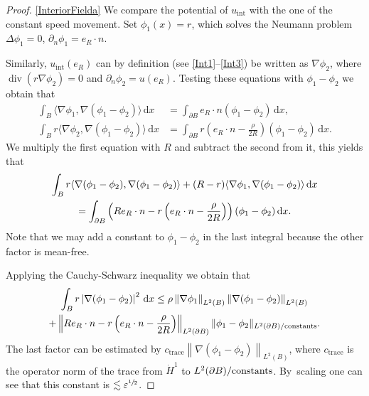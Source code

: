 \documentclass[10pt]{amsart}
\let\epsilon\varepsilon
\newcommand{\constants}{\textup{constants}}
\theoremstyle{definition}
\renewcommand{\div}{\operatorname{div}}
\newcommand\norm[1]{\left\lVert #1\right\rVert}
\newcommand\anorm[1]{\lVert #1\rVert}
\newcommand\scalar[2]{\langle #1,#2\rangle}
\newcommand\eq{=}
\newcommand\dd{\,\mathrm{d}}
\newcommand\dx{\dd x}
\let\de\partial
\let\eps\epsilon
\begin{document}
\skpt
\begin{proof}

\eqref{InteriorFielda}
We compare the potential of $u_\mathrm{int}$ with the one of the constant speed movement.
Set $\phi_1(x)=r$, which solves the Neumann problem $\Delta \phi_1=0$, $\de_n\phi_1=e_R\cdot n$.

Similarly, $u_\mathrm{int}(e_R)$ can by definition (see \eqref{Int1}--\eqref{Int3}) be written as $\nabla \phi_2$, where $\div(r\nabla\phi_2)=0$ and $\de_n\phi_2=u(e_R)$. Testing these equations with $\phi_1-\phi_2$ we obtain that
\begin{align*}
\int_{B} \scalar{\nabla \phi_1}{\nabla(\phi_1-\phi_2)}\dx&\eq\int_{\de B} e_R\cdot n(\phi_1-\phi_2)\dx,\\
\int_{B}r\scalar{\nabla \phi_2}{\nabla(\phi_1-\phi_2)}\dx&\eq\int_{\de B}r\left(e_R\cdot n-\frac{\rho}{2R}\right)(\phi_1-\phi_2)\dx.
\end{align*}
We multiply the first equation with $R$ and subtract the second from it, this yields that
\begin{multline*}
\int_{B} r\scalar{\nabla(\phi_1-\phi_2)}{\nabla(\phi_1-\phi_2)}+(R-r)\scalar{\nabla \phi_1}{\nabla(\phi_1-\phi_2)}\dx\\
\eq\int_{\de B} \left(Re_R\cdot n-r\left(e_R\cdot n-\frac{\rho}{2R}\right)\right)(\phi_1-\phi_2)\dx.\notag
\end{multline*}
Note that we may add a constant to $\phi_1-\phi_2$ in the last integral because the other factor is mean-free.

Applying the Cauchy-Schwarz inequality we obtain that
\begin{multline}\label{L2bound1}
\int_{B}r\left|\nabla(\phi_1-\phi_2)\right|^2\dx\leq \rho\norm{\nabla\phi_1}_{L^2(B)}\norm{\nabla(\phi_1-\phi_2)}_{L^2(B)}\\
+\norm{Re_R\cdot n-r\left(e_R\cdot n-\frac{\rho}{2R}\right)}_{L^2(\de B)}\anorm{\phi_1-\phi_2}_{L^2(\de B)/\constants}.
\end{multline}
The last factor can be estimated by $c_\mathrm{trace}\norm{\nabla(\phi_1-\phi_2)}_{L^2(B)}$, where $c_\mathrm{trace}$ is the operator norm of the trace from $\dot{H}^1$ to $L^2(\de B)/\constants$. By~scaling one can see that this constant is $\lesssim \eps^{\sfrac12}$.


\end{proof}
\end{document}
